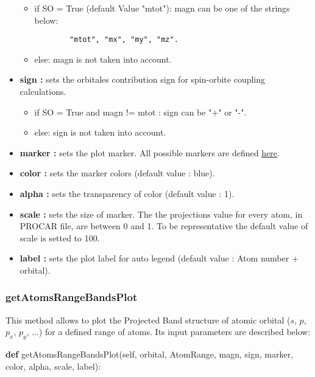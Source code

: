 \documentclass[11pt]{article}
\providecommand{\tightlist}{%
      \setlength{\itemsep}{0pt}\setlength{\parskip}{0pt}}
\newenvironment{Shaded}{}{}
\newcommand{\KeywordTok}[1]{\textcolor[rgb]{0.00,0.44,0.13}{\textbf{{#1}}}}
\newcommand{\NormalTok}[1]{{#1}}
\newcommand{\VariableTok}[1]{\textcolor[rgb]{0.10,0.09,0.49}{{#1}}}
\begin{document}
\begin{itemize}
  \begin{itemize}
  \item
    if SO = True (default Value "mtot"): magn can be one of the strings
    below:

\begin{verbatim}
        "mtot", "mx", "my", "mz".
\end{verbatim}
  \item
    else: magn is not taken into account.
  \end{itemize}
\item
  \textbf{sign :} sets the orbitales contribution sign for spin-orbite
  coupling calculations.

  \begin{itemize}
  \tightlist
  \item
    if SO = True and magn != mtot : sign can be "+" or "-".
  \item
    else: sign is not taken into account.
  \end{itemize}
\item
  \textbf{marker :} sets the plot marker. All possible markers are
  defined \href{https://matplotlib.org/api/markers_api.html}{here}.
\item
  \textbf{color :} sets the marker colors (default value : blue).
\item
  \textbf{alpha :} sets the transparency of color (default value : 1).
\item
  \textbf{scale :} sets the size of marker. The the projections value
  for every atom, in PROCAR file, are between 0 and 1. To be
  representative the default value of scale is setted to 100.
\item
  \textbf{label :} sets the plot label for auto legend (default value :
  Atom number + orbital).
\end{itemize}

\subsubsection{getAtomsRangeBandsPlot}\label{getatomsrangebandsplot}

This method allows to plot the Projected Band structure of atomic
orbital (\(s\), \(p\), \(p_x\), \(p_y\), ...) for a defined range of
atoms. Its input parameters are described below:

\begin{Shaded}
\begin{Highlighting}[]
\KeywordTok{def} \NormalTok{getAtomsRangeBandsPlot(}\VariableTok{self}\NormalTok{, orbital, AtomRange, magn, sign, marker, color, alpha, scale, label):}
\end{Highlighting}
\end{Shaded}
\end{document}
